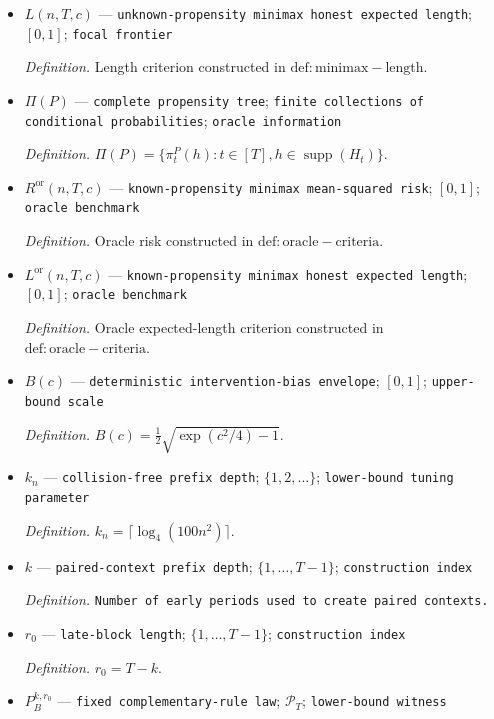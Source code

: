 \documentclass{article}
\begin{document}
\begin{itemize}
  \item \(L(n,T,c)\) --- \texttt{unknown-\allowbreak{}propensity minimax honest expected length}; \([0,1]\); \texttt{focal frontier}
  \par\smallskip\noindent\emph{Definition.} Length criterion constructed in \(\mathrm{def:minimax-length}\).
  \item \(\Pi(P)\) --- \texttt{complete propensity tree}; \texttt{finite collections of conditional probabilities}; \texttt{oracle information}
  \par\smallskip\noindent\emph{Definition.} \(\Pi(P)=\{\pi_t^P(h):t\in[T],h\in\mathop{\mathrm{supp}}(H_t)\}\).
  \item \(R^{\mathrm{or}}(n,T,c)\) --- \texttt{known-\allowbreak{}propensity minimax mean-\allowbreak{}squared risk}; \([0,1]\); \texttt{oracle benchmark}
  \par\smallskip\noindent\emph{Definition.} Oracle risk constructed in \(\mathrm{def:oracle-criteria}\).
  \item \(L^{\mathrm{or}}(n,T,c)\) --- \texttt{known-\allowbreak{}propensity minimax honest expected length}; \([0,1]\); \texttt{oracle benchmark}
  \par\smallskip\noindent\emph{Definition.} Oracle expected-length criterion constructed in \(\mathrm{def:oracle-criteria}\).
  \item \(B(c)\) --- \texttt{deterministic intervention-\allowbreak{}bias envelope}; \([0,1]\); \texttt{upper-\allowbreak{}bound scale}
  \par\smallskip\noindent\emph{Definition.} \(B(c)=\frac12\sqrt{\exp(c^2/4)-1}\).
  \item \(k_n\) --- \texttt{collision-\allowbreak{}free prefix depth}; \(\{1,2,\ldots\}\); \texttt{lower-\allowbreak{}bound tuning parameter}
  \par\smallskip\noindent\emph{Definition.} \(k_n=\lceil\log_4(100n^2)\rceil\).
  \item \(k\) --- \texttt{paired-\allowbreak{}context prefix depth}; \(\{1,\ldots,T-1\}\); \texttt{construction index}
  \par\smallskip\noindent\emph{Definition.} \texttt{Number of early periods used to create paired contexts.}
  \item \(r_0\) --- \texttt{late-\allowbreak{}block length}; \(\{1,\ldots,T-1\}\); \texttt{construction index}
  \par\smallskip\noindent\emph{Definition.} \(r_0=T-k\).
  \item \(P_B^{k,r_0}\) --- \texttt{fixed complementary-\allowbreak{}rule law}; \(\mathcal P_T\); \texttt{lower-\allowbreak{}bound witness}

\end{itemize}
\end{document}
